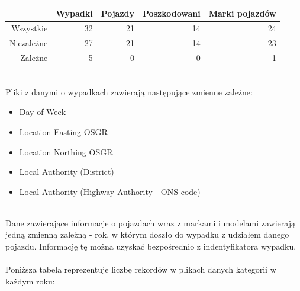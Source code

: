 \documentclass{article}
\begin{document}
\begin{tabular}{|r|r|r|r|r|}
  \hline 
    & Wypadki & Pojazdy & Poszkodowani & Marki pojazdów\\
  \hline 
  Wszystkie & 32 & 21 & 14 & 24\\
  \hline
  Niezależne & 27 & 21 & 14 & 23\\
  \hline
  Zależne & 5 & 0 & 0 & 1\\
  \hline
\end{tabular} \\[0.5cm]
Pliki z danymi o wypadkach zawierają następujące zmienne zależne: %
\begin{itemize}
    \item  Day of Week
    \item  Location Easting OSGR 
    \item  Location Northing OSGR 
    \item  Local Authority (District)
    \item  Local Authority (Highway Authority - ONS code)
\end{itemize}\\
Dane zawierające informacje o pojazdach wraz z markami i modelami zawierają jedną zmienną zależną - rok, w którym doszło do wypadku z udziałem danego pojazdu. Informację tę można uzyskać bezpośrednio z indentyfikatora wypadku.\\\\
Poniższa tabela reprezentuje liczbę rekordów w plikach danych kategorii w każdym roku:\\
\end{document}
